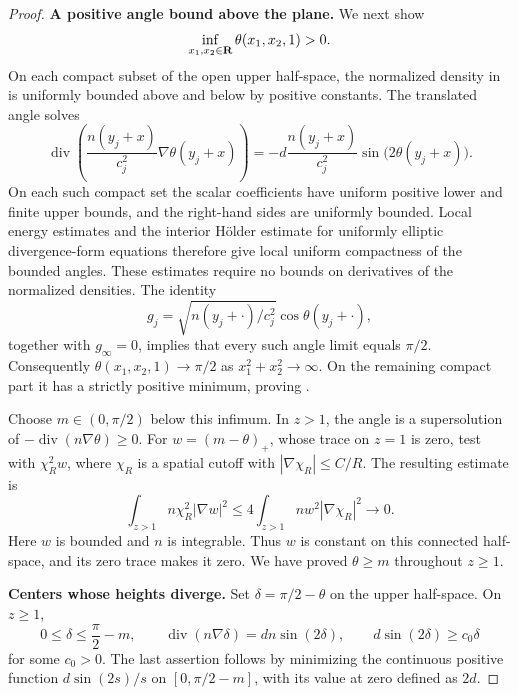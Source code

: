 \begin{proof}
\smallskip\noindent\textbf{A positive angle bound above the plane.}
We next show
\begin{equation}
 \inf_{x_1,x_2\in\mathbf R}\theta(x_1,x_2,1)>0.
 \label{eq:angle-plane-parallel-lower-bound}
\end{equation}
On each compact subset of the open upper half-space, the normalized
density in  is uniformly bounded above
and below by positive constants.  The translated angle solves
\[
 \operatorname{div}\!\left(\frac{n(y_j+x)}{c_j^2}
                         \nabla\theta(y_j+x)\right)
 =-d\frac{n(y_j+x)}{c_j^2}\sin\bigl(2\theta(y_j+x)\bigr).
\]
On each such compact set the scalar coefficients have uniform positive
lower and finite upper bounds, and the right-hand sides are uniformly
bounded.  Local energy estimates and the interior H\"older estimate for
uniformly elliptic divergence-form equations
\cite[Lecture~18, Theorem~3]{SimonPDE} therefore give local uniform
compactness of the bounded angles.  These estimates require no bounds
on derivatives of the normalized densities.  The identity
\[
 g_j=\sqrt{n(y_j+\cdot)/c_j^2}\cos\theta(y_j+\cdot),
\]
together with \(g_\infty=0\), implies that every such angle limit
equals \(\pi/2\).
Consequently \(\theta(x_1,x_2,1)\to\pi/2\) as
\(x_1^2+x_2^2\to\infty\).  On the remaining compact part it has a
strictly positive minimum, proving
.

Choose \(m\in(0,\pi/2)\) below this infimum.  In \(z>1\), the angle
is a supersolution of \(-\operatorname{div}(n\nabla\theta)\ge0\).
For \(w=(m-\theta)_+\), whose trace on \(z=1\) is zero, test with
\(\chi_R^2w\), where \(\chi_R\) is a spatial cutoff with
\(|\nabla\chi_R|\le C/R\).  The resulting estimate is
\[
 \int_{z>1} n\chi_R^2|\nabla w|^2
 \le4\int_{z>1}n w^2|\nabla\chi_R|^2\longrightarrow0.
\]
Here \(w\) is bounded and \(n\) is integrable.  Thus \(w\) is constant
on this connected half-space, and its zero trace makes it zero.  We have
proved \(\theta\ge m\) throughout \(z\ge1\).

\smallskip\noindent\textbf{Centers whose heights diverge.}
Set \(\delta=\pi/2-\theta\) on the upper half-space.  On \(z\ge1\),
\[
 0\le\delta\le\frac\pi2-m,\qquad
 \operatorname{div}(n\nabla\delta)=d n\sin(2\delta),\qquad
 d\sin(2\delta)\ge c_0\delta
\]
for some \(c_0>0\).  The last assertion follows by minimizing the
continuous positive function \(d\sin(2s)/s\) on
\([0,\pi/2-m]\), with its value at zero defined as \(2d\).


\end{proof}
